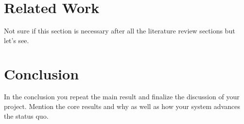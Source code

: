 \documentclass[a4paper,11pt,oneside]{report}
\begin{document}
\chapter{Related Work}



Not sure if this section is necessary after all the literature review sections but let's see.

\chapter{Conclusion}

In the conclusion you repeat the main result and finalize the discussion of
your project. Mention the core results and why as well as how your system
advances the status quo.

\cleardoublepage
{}
{}
\printbibliography

%
%
\end{document}
